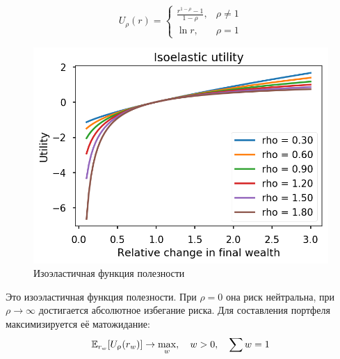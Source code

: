 \begin{minipage}{0.4\linewidth}
\begin{equation}
U_\rho(r) = \begin{cases}
\frac{r^{1-\rho}-1}{1-\rho}, &\rho\ne 1\\
\ln r, &\rho = 1
\end{cases}
\end{equation}
\end{minipage}
\begin{minipage}{0.5\linewidth}
	\begin{figure}[H]
		\centering
		\includegraphics[width=0.7\linewidth]{Thesis/images/isoelastic}
		\caption{Изоэластичная функция полезности}
		\label{fig:isoelastic}	
	\end{figure}
\end{minipage}
\vspace{.5cm}

Это изоэластичная функция полезности. При $\rho=0$ она риск нейтральна, при $\rho \to \infty$ достигается абсолютное избегание риска. Для составления портфеля максимизируется её  матожидание:
\begin{equation}
\Eb[r_w]{U_\rho(r_w)} \to \max_w, \quad w>0,\quad \sum w = 1
\label{eq:isoelastic}
\end{equation}
